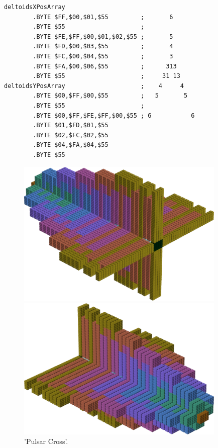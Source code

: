 \begin{lstlisting}
deltoidsXPosArray                     
        .BYTE $FF,$00,$01,$55         ;       6      
        .BYTE $55                     ;              
        .BYTE $FE,$FF,$00,$01,$02,$55 ;       5      
        .BYTE $FD,$00,$03,$55         ;       4      
        .BYTE $FC,$00,$04,$55         ;       3      
        .BYTE $FA,$00,$06,$55         ;      313     
        .BYTE $55                     ;     31 13    
deltoidsYPosArray                     ;    4     4   
        .BYTE $00,$FF,$00,$55         ;   5       5  
        .BYTE $55                     ;              
        .BYTE $00,$FF,$FE,$FF,$00,$55 ; 6           6
        .BYTE $01,$FD,$01,$55
        .BYTE $02,$FC,$02,$55
        .BYTE $04,$FA,$04,$55
        .BYTE $55
\end{lstlisting}

\clearpage
\clearpage

\begin{figure}[H]
    \centering
    \begin{adjustbox}{width=10cm,center}
      \includegraphics[width=10cm]{src/colorspace_patterns/pattern4-45.png}%
    \end{adjustbox}
    \begin{adjustbox}{width=10cm}
      \includegraphics[width=10cm]{src/colorspace_patterns/pattern4-225.png}%
    \end{adjustbox}
\caption{'Pulsar Cross'.}
\end{figure}
\clearpage

